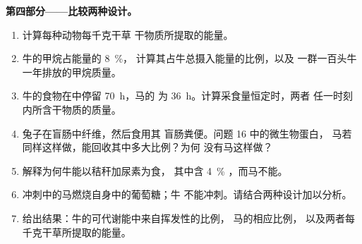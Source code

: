 \begin{problem}
\medskip
\noindent\textbf{第四部分——比较两种设计。}
\begin{enumerate}[resume]
  \item 计算每种动物每千克干草
        干物质所提取的能量。
  \item 牛的甲烷占能量的 \qty{8}{\%}，
        计算其占牛总摄入能量的比例，以及
        一群一百头牛一年排放的甲烷质量。
  \item 牛的食物在中停留 \qty{70}{h}，马的
        为 \qty{36}{h}。计算采食量恒定时，两者
        任一时刻内所含干物质的质量。
  \item 兔子在盲肠中纤维，然后食用其
        盲肠粪便。问题 16 中的微生物蛋白，
        马若同样这样做，能回收其中多大比例？为何
        没有马这样做？
  \item 解释为何牛能以秸秆加尿素为食，
        其中含 \qty{4}{\%} ，而马不能。
  \item 冲刺中的马燃烧自身中的葡萄糖；牛
        不能冲刺。请结合两种设计加以分析。
  \item 给出结果：牛的可代谢能中来自挥发性的比例，
        马的相应比例，
        以及两者每千克干草所提取的能量。
\end{enumerate}
\end{problem}

